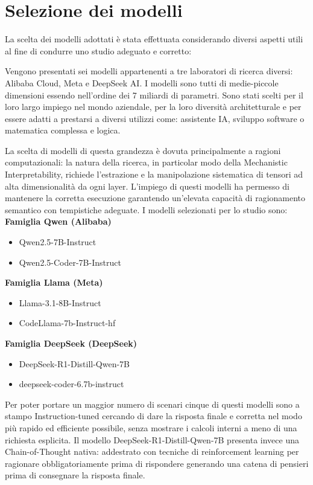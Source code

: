 \section{Selezione dei modelli}

La scelta dei modelli adottati è stata effettuata considerando diversi aspetti utili al fine di condurre uno studio adeguato e corretto:

Vengono presentati sei modelli appartenenti a tre laboratori di ricerca diversi: Alibaba Cloud, Meta e DeepSeek AI. 
I modelli sono tutti di medie-piccole dimensioni essendo nell'ordine dei 7 miliardi di parametri. Sono stati scelti per il loro largo impiego nel mondo aziendale, per la loro diversità architetturale e per essere adatti a prestarsi a diversi utilizzi come: assistente IA, sviluppo software o matematica complessa e logica.

La scelta di modelli di questa grandezza è dovuta principalmente a ragioni computazionali: la natura della ricerca, in particolar modo della Mechanistic Interpretability, richiede l'estrazione e la manipolazione sistematica di tensori ad alta dimensionalità da ogni layer. L'impiego di questi modelli ha permesso di mantenere la corretta esecuzione garantendo un'elevata capacità di ragionamento semantico con tempistiche adeguate. I modelli selezionati per lo studio sono:\\

\textbf{Famiglia Qwen (Alibaba)}
\begin{itemize}[noitemsep]
    \item Qwen2.5-7B-Instruct
    \item Qwen2.5-Coder-7B-Instruct
\end{itemize}

\textbf{Famiglia Llama (Meta)}
\begin{itemize}[noitemsep]
    \item Llama-3.1-8B-Instruct
    \item CodeLlama-7b-Instruct-hf
\end{itemize}

\textbf{Famiglia DeepSeek (DeepSeek)}
\begin{itemize}[noitemsep]
    \item DeepSeek-R1-Distill-Qwen-7B
    \item deepseek-coder-6.7b-instruct
\end{itemize}

Per poter portare un maggior numero di scenari cinque di questi modelli sono a stampo Instruction-tuned cercando di dare la risposta finale e corretta nel modo più rapido ed efficiente possibile, senza mostrare i calcoli interni a meno di una richiesta esplicita.
Il modello DeepSeek-R1-Distill-Qwen-7B presenta invece una Chain-of-Thought nativa: addestrato con tecniche di reinforcement learning per ragionare obbligatoriamente prima di rispondere generando una catena di pensieri prima di consegnare la risposta finale.

